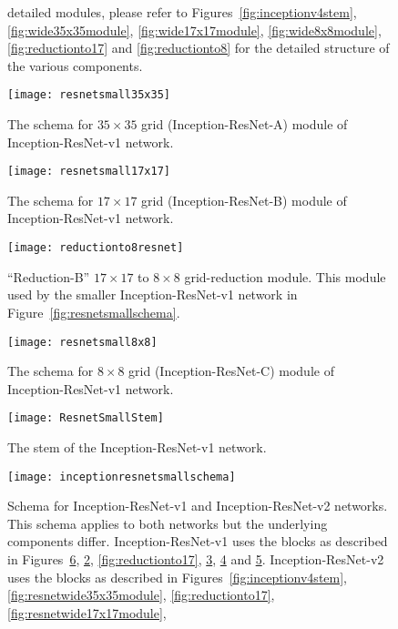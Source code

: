 \documentclass[10pt,twocolumn,letterpaper]{article}
\begin{document}
\begin{figure}
{  detailed modules, please refer to Figures~\ref{fig:inceptionv4stem},
  \ref{fig:wide35x35module}, \ref{fig:wide17x17module}, \ref{fig:wide8x8module},
  \ref{fig:reductionto17} and \ref{fig:reductionto8} for the detailed structure
  of the various components.
}
\label{fig:inceptionv4}
\end{figure}\begin{figure}
\centering
\texttt{[image: resnetsmall35x35]}
\caption{The schema for $35\times 35$ grid (Inception-ResNet-A) module of Inception-ResNet-v1
 network.}
\label{fig:resnetsmall35x35module}
\end{figure}\begin{figure}
\centering
\texttt{[image: resnetsmall17x17]}
\caption{The schema for $17\times 17$ grid (Inception-ResNet-B)  module of Inception-ResNet-v1
 network.}
\label{fig:resnetsmall17x17module}
\end{figure}\begin{figure}
\centering
\texttt{[image: reductionto8resnet]}
\caption{``Reduction-B'' $17\times 17$ to $8\times 8$ grid-reduction module.
  This module used by the smaller Inception-ResNet-v1 network
  in Figure~\ref{fig:resnetsmallschema}.
}
\label{fig:reductionto8resnet}
\end{figure}\begin{figure}
\centering
\texttt{[image: resnetsmall8x8]}
\caption{The schema for $8\times 8$ grid (Inception-ResNet-C) module of Inception-ResNet-v1
 network.}
\label{fig:resnetsmall8x8module}
\end{figure}\begin{figure}
\centering
\texttt{[image: ResnetSmallStem]}
\caption{The stem of the Inception-ResNet-v1 network.}
\label{fig:resnetsmallstem}
\end{figure}\begin{figure}
\centering
\texttt{[image: inceptionresnetsmallschema]}
\caption{Schema for Inception-ResNet-v1 and Inception-ResNet-v2 networks.
  This schema applies to both networks but the underlying components differ.
  Inception-ResNet-v1 uses the blocks as described in Figures~\ref{fig:resnetsmallstem},
  \ref{fig:resnetsmall35x35module}, \ref{fig:reductionto17}, \ref{fig:resnetsmall17x17module},
  \ref{fig:reductionto8resnet} and \ref{fig:resnetsmall8x8module}.
  Inception-ResNet-v2 uses the blocks as described in Figures~\ref{fig:inceptionv4stem},
  \ref{fig:resnetwide35x35module}, \ref{fig:reductionto17},\ref{fig:resnetwide17x17module},
}
\end{figure}
\end{document}
